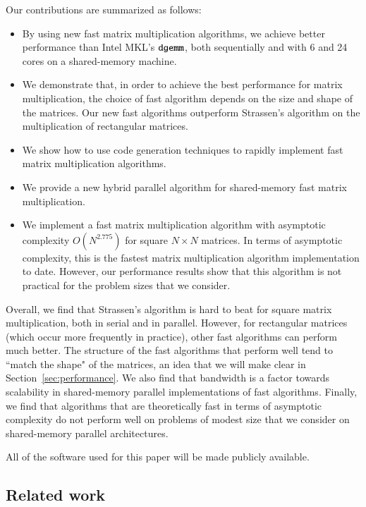 \documentclass[preprint]{sigplanconf}
\begin{document}
Our contributions are summarized as follows:
\begin{itemize}
\item 
By using new fast matrix multiplication algorithms, we achieve better performance than Intel MKL's $\texttt{dgemm}$, both sequentially and with 6 and 24 cores on a shared-memory machine.

\item 
We demonstrate that, in order to achieve the best performance for matrix multiplication, the choice of fast algorithm depends on the size and shape of the matrices.
Our new fast algorithms outperform Strassen's algorithm on the multiplication of rectangular matrices.

\item
We show how to use code generation techniques to rapidly implement fast matrix multiplication algorithms.

\item
We provide a new hybrid parallel algorithm for shared-memory fast matrix multiplication.

\item
We implement a fast matrix multiplication algorithm with asymptotic complexity $O(N^{2.775})$ for square $N \times N$ matrices.
In terms of asymptotic complexity, this is the fastest matrix multiplication algorithm implementation to date.
However, our performance results show that this algorithm is not practical for the problem sizes that we consider.



\end{itemize}

Overall, we find that Strassen's algorithm is hard to beat for square matrix multiplication, both in serial and in parallel.
However, for rectangular matrices (which occur more frequently in practice), other fast algorithms can perform much better.
The structure of the fast algorithms that perform well tend to ``match the shape" of the matrices, an idea that we will make clear in Section~\ref{sec:performance}.
We also find that bandwidth is a factor towards scalability in shared-memory parallel implementations of fast algorithms.
Finally, we find that algorithms that are theoretically fast in terms of asymptotic complexity do not perform well on problems of modest size that we consider on shared-memory parallel architectures.

All of the software used for this paper will be made publicly available.

\subsection{Related work}
\label{sec:related}
\end{document}
